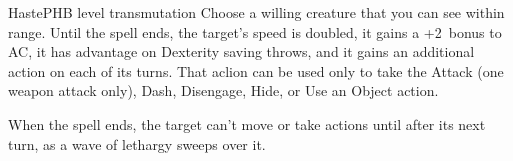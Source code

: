 \begin{spell}{Haste}{PHB}{ level transmutation}
{
}
Choose a willing creature that you can see within range.
Until the spell ends, the target's speed is doubled, it
gains a +2~bonus to AC, it has advantage on Dexterity
saving throws, and it gains an additional action on each
of its turns. That aclion can be used only to take the
Attack (one weapon attack only), Dash, Disengage, Hide,
or Use an Object action.

When the spell ends, the target can't move or take
actions until after its next turn, as a wave of lethargy
sweeps over it.
\end{spell}